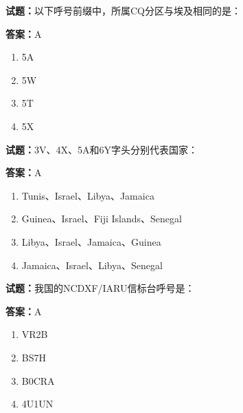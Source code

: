 \documentclass{ctexbook}
\begin{document}




\vspace{1em}

\textbf{试题：}以下呼号前缀中，所属CQ分区与埃及相同的是： 

\textbf{答案：}A 

\begin{enumerate}[leftmargin=3em]
  \item 5A 

  \item 5W 

  \item 5T 

  \item 5X 

\end{enumerate}





\vspace{1em}

\textbf{试题：}3V、4X、5A和6Y字头分别代表国家： 

\textbf{答案：}A 

\begin{enumerate}[leftmargin=3em]
  \item Tunis、Israel、Libya、Jamaica 

  \item Guinea、Israel、Fiji Islands、Senegal 

  \item Libya、Israel、Jamaica、Guinea 

  \item Jamaica、Israel、Libya、Senegal 

\end{enumerate}





\vspace{1em}

\textbf{试题：}我国的NCDXF/IARU信标台呼号是： 

\textbf{答案：}A 

\begin{enumerate}[leftmargin=3em]
  \item VR2B 

  \item BS7H 

  \item B0CRA 

  \item 4U1UN 

\end{enumerate}
\end{document}
